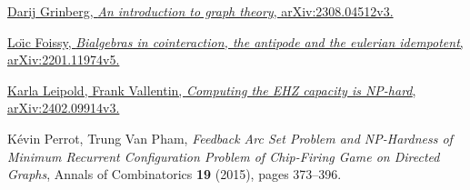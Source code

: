\documentclass[numbers=enddot,12pt,final,onecolumn,notitlepage]{scrartcl}%
\theoremstyle{definition}
\theoremstyle{plainsl}
\begin{document}
\begin{thebibliography}{99999999}                                                                                         %


\href{https://arxiv.org/abs/2308.04512v3}{Darij Grinberg,
\textit{An introduction to graph theory}, arXiv:2308.04512v3.}

%
\href{https://arxiv.org/abs/2201.11974v5}{Lo\"{\i}c Foissy, \textit{Bialgebras
in cointeraction, the antipode and the eulerian idempotent},
arXiv:2201.11974v5.}

\href{https://arxiv.org/abs/2402.09914v3}{Karla
Leipold, Frank Vallentin, \textit{Computing the EHZ capacity is NP-hard},
arXiv:2402.09914v3.}

K\'{e}vin Perrot, Trung Van Pham, \textit{Feedback
Arc Set Problem and NP-Hardness of Minimum Recurrent Configuration Problem of
Chip-Firing Game on Directed Graphs}, Annals of Combinatorics \textbf{19}
(2015), pages 373--396.
\end{thebibliography}
\end{document}
